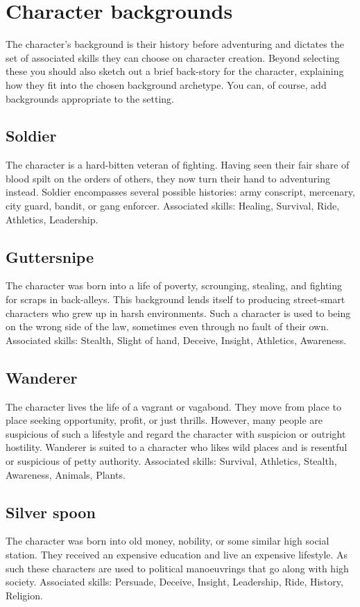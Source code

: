 \documentclass[a4paper,10pt,oneside]{book}
\begin{document}
\section{Character backgrounds}
\label{sec:backgrounds}
The character's background is their history before adventuring and dictates the set of associated skills they can choose on character creation. Beyond selecting these you should also sketch out a brief back-story for the character, explaining how they fit into the chosen background archetype. You can, of course, add backgrounds appropriate to the setting.

\subsection{Soldier}
The character is a hard-bitten veteran of fighting. Having seen their fair share of blood spilt on the orders of others, they now turn their hand to adventuring instead. Soldier encompasses several possible histories: army conscript, mercenary, city guard, bandit, or gang enforcer. Associated skills: Healing, Survival, Ride, Athletics, Leadership. 

\subsection{Guttersnipe}
The character was born into a life of poverty, scrounging, stealing, and fighting for scraps in back-alleys. This background lends itself to producing street-smart characters who grew up in harsh environments. Such a character is used to being on the wrong side of the law, sometimes even through no fault of their own. Associated skills: Stealth, Slight of hand, Deceive, Insight, Athletics, Awareness.

\subsection{Wanderer}
The character lives the life of a vagrant or vagabond. They move from place to place seeking opportunity, profit, or just thrills. However, many people are suspicious of such a lifestyle and regard the character with suspicion or outright hostility. Wanderer is suited to a character who likes wild places and is resentful or suspicious of petty authority. Associated skills: Survival, Athletics, Stealth, Awareness, Animals, Plants.

\subsection{Silver spoon}
The character was born into old money, nobility, or some similar high social station. They received an expensive education and live an expensive lifestyle. As such these characters are used to political manoeuvrings that go along with high society. Associated skills: Persuade, Deceive, Insight, Leadership, Ride, History, Religion.
\end{document}

